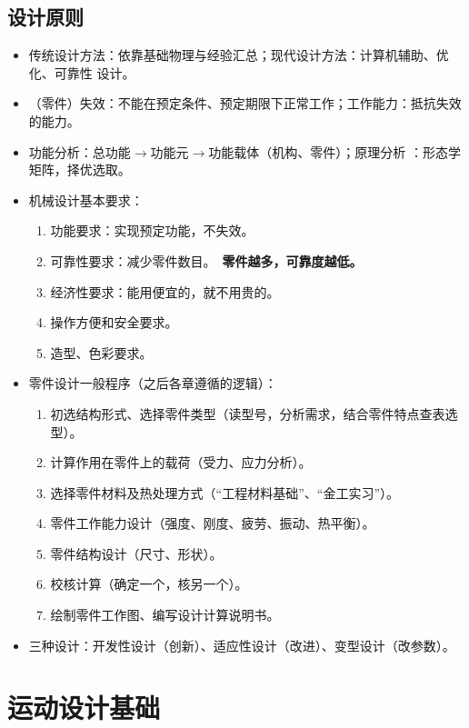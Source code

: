 \documentclass[12pt,a4paper]{article}
\newcommand{\tightlist}{\setlength{\parskip}{0pt}\setlength{\itemsep}{0pt}}
\newcommand{\hint}[1]{\textsf{（#1）}}
\newcommand{\minor}[1]{{\color{gray} #1}}
\newcommand{\then}{$\to$}
\renewcommand{\emph}[1]{\faIcon[regular]{lightbulb}\ \textbf{#1}}
\begin{document}
\subsection{设计原则}
\begin{itemize}\tightlist
    \item 传统设计方法：依靠基础物理与经验汇总；现代设计方法：计算机辅助、优化、可靠性
    设计。
    \item \hint{零件}失效：不能在预定条件、预定期限下正常工作；工作能力：抵抗失效的能力。
    \item \minor{功能分析：总功能\then 功能元\then 功能载体\hint{机构、零件}；原理分析
    ：形态学矩阵，择优选取。}
    \item 机械设计基本要求：
    \begin{enumerate}\tightlist
        \item 功能要求：实现预定功能，不失效。
        \item 可靠性要求：减少零件数目。\emph{零件越多，可靠度越低。}
        \item 经济性要求：能用便宜的，就不用贵的。
        \item \minor{操作方便和安全要求。}
        \item \minor{造型、色彩要求。}
    \end{enumerate}
    \item 零件设计一般程序\hint{之后各章遵循的逻辑}：
    \begin{enumerate}\tightlist
        \item 初选结构形式、选择零件类型\hint{读型号，分析需求，结合零件特点查表选型}。
        \item 计算作用在零件上的载荷\hint{受力、应力分析}。
        \item 选择零件材料及热处理方式\hint{“工程材料基础”、“金工实习”}。
        \item 零件工作能力设计\hint{强度、刚度、疲劳、振动、热平衡}。
        \item 零件结构设计\hint{尺寸、形状}。
        \item 校核计算\hint{确定一个，核另一个}。
        \item \minor{绘制零件工作图、编写设计计算说明书}。
    \end{enumerate}
    \item 三种设计：开发性设计\hint{创新}、适应性设计\hint{改进}、变型设计\hint{改参数}。
\end{itemize}

\section{运动设计基础}
\end{document}
